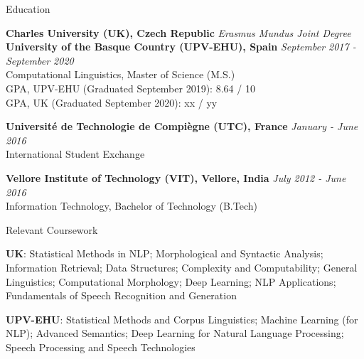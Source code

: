 \documentclass{resume}
\begin{document}




\begin{rSection}{Education}

    {\bf Charles University (UK), Czech Republic} \hfill 
        {\em Erasmus Mundus Joint Degree}\\
    {\bf University of the Basque Country (UPV-EHU), Spain} \hfill 
        {\em September 2017 - September 2020}\\
            Computational Linguistics, Master of Science (M.S.)\\
            GPA, UPV-EHU (Graduated September 2019): 8.64 / 10\\
            GPA, UK (Graduated September 2020): xx / yy
    
    {\bf Universit\'e de Technologie de Compi\`egne (UTC), France} \hfill
        {\em January - June 2016}\\
            International Student Exchange
            
    {\bf Vellore Institute of Technology (VIT), Vellore, India} \hfill
        {\em July 2012 - June 2016}\\
            Information Technology, Bachelor of Technology (B.Tech)
    
    \begin{rSubsection}{\large Relevant Coursework}{}{}{}
        \item {\bf UK}: Statistical Methods in NLP; Morphological and Syntactic 
            Analysis; Information Retrieval; Data Structures; Complexity and 
            Computability; General Linguistics; Computational Morphology; Deep 
            Learning; NLP Applications; Fundamentals of Speech Recognition and 
            Generation
            
        \item {\bf UPV-EHU}: Statistical Methods and Corpus Linguistics; Machine
            Learning (for NLP); Advanced Semantics; Deep Learning for Natural 
            Language Processing; Speech Processing and Speech Technologies
    \end{rSubsection}
    
\end{rSection}
\end{document}
